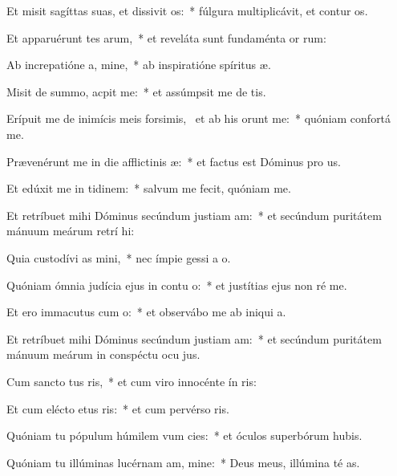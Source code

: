 \item Et misit sagíttas suas, et dissivit os:~* fúlgura multiplicávit, et contur os.
\item Et apparuérunt tes arum,~* et reveláta sunt fundaménta or rum:
\item Ab increpatióne a, mine,~* ab inspiratióne spíritus  æ.
\item Misit de summo,  acpit me:~* et assúmpsit me de  tis.
\item Erípuit me de inimícis meis forsimis,~\pscross{} et ab his  orunt me:~* quóniam confortá   me.
\item Prævenérunt me in die afflictinis æ:~* et factus est Dóminus pro us.
\item Et edúxit me in tidinem:~* salvum me fecit, quóniam  me.
\item Et retríbuet mihi Dóminus secúndum justiam am:~* et secúndum puritátem mánuum meárum retrí hi:
\item Quia custodívi as mini,~* nec ímpie gessi a  o.
\item Quóniam ómnia judícia ejus in contu o:~* et justítias ejus non ré  me.
\item Et ero immacutus cum o:~* et observábo me ab iniqui a.
\item Et retríbuet mihi Dóminus secúndum justiam am:~* et secúndum puritátem mánuum meárum in conspéctu ocu jus.
\item Cum sancto tus ris,~* et cum viro innocénte ín ris:
\item Et cum elécto etus ris:~* et cum pervérso ris.
\item Quóniam tu pópulum húmilem vum cies:~* et óculos superbórum hubis.
\item Quóniam tu illúminas lucérnam am, mine:~* Deus meus, illúmina té as.
